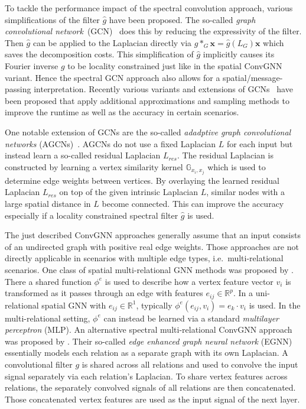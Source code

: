 \documentclass[12pt]{scrartcl}
\begin{document}
\begin{enumerate}[label=\textbf{\arabic*.}]
\begin{enumerate}[label=\textbf{\alph*)}]
				To tackle the performance impact of the spectral convolution approach, various simplifications of the filter $\hat{g}$ have been proposed.
				The so-called \textit{graph convolutional network}~(GCN)~\cite{Kipf2017} does this by reducing the expressivity of the filter.
				Then $\hat{g}$ can be applied to the Laplacian directly via $g *_G \bm{x} = \hat{g}(L_G) \bm{x}$ which saves the decomposition costs.
				This simplification of $\hat{g}$ implicitly causes its Fourier inverse $g$ to be locality constrained just like in the spatial ConvGNN variant.
				Hence the spectral GCN approach also allows for a spatial/message-passing interpretation.
				Recently various variants and extensions of GCNs~\cite{Hamilton2017}\cite{Chen2018}\cite{Chen2017}\cite{Chiang2019}\cite{Du2017} have been proposed that apply additional approximations and sampling methods to improve the runtime as well as the accuracy in certain scenarios.

				One notable extension of GCNs are the so-called \textit{adadptive graph convolutional networks} (AGCNs)~\cite{Li2018}.
				AGCNs do not use a fixed Laplacian $L$ for each input but instead learn a so-called residual Laplacian $L_\mathit{res}$.
				The residual Laplacian is constructed by learning a vertex similarity kernel $\mathbb{G}_{x_i,x_j}$ which is used to determine edge weights between vertices.
				By overlaying the learned residual Laplacian $L_\mathit{res}$ on top of the given intrinsic Laplacian $L$, similar nodes with a large spatial distance in $L$ become connected.
				This can improve the accuracy especially if a locality constrained spectral filter $\hat{g}$ is used.
		\end{enumerate}

		The just described ConvGNN approaches generally assume that an input consists of an undirected graph with positive real edge weights.
		Those approaches are not directly applicable in scenarios with multiple edge types, i.e.\ multi-relational scenarios.
		One class of spatial multi-relational GNN methods was proposed by \citet{Battaglia2018}.
		There a shared function $\phi^e$ is used to describe how a vertex feature vector $v_i$ is transformed as it passes through an edge with features $e_{ij} \in \mathbb{R}^p$.
		In a uni-relational spatial GNN with $e_{ij} \in \mathbb{R}^{1}$, typically $\phi^e(e_{ij}, v_i) = e_k \cdot v_i$ is used.
		In the multi-relational setting, $\phi^e$ can instead be learned via a standard \textit{multilayer perceptron} (MLP).
		An alternative spectral multi-relational ConvGNN approach was proposed by \citet{Gong2018}.
		Their so-called \textit{edge enhanced graph neural network} (EGNN) essentially models each relation as a separate graph with its own Laplacian.
		A convolutional filter $g$ is shared across all relations and used to convolve the input signal separately via each relation's Laplacian.
		To share vertex features across relations, the separately convolved signals of all relations are then concatenated.
		Those concatenated vertex features are used as the input signal of the next layer.


\end{enumerate}
\end{document}
